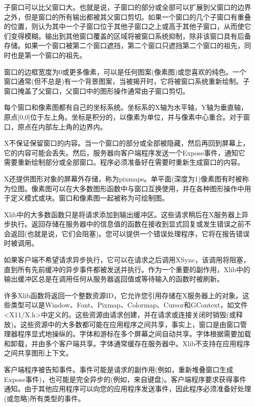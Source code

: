 子窗口可以比父窗口大。也就是说，子窗口的部分或全部可以扩展到父窗口的边界之外，但是窗口的所有输出都被其父窗口剪切。如果一个窗口的几个子窗口有重叠的位置，则认为其中一个子窗口位于其他子窗口之上或高于其他子窗口，从而使它们变得模糊。输出到其他窗口覆盖的区域将被窗口系统抑制，除非该窗口具有后备存储。如果一个窗口被第二个窗口遮挡，第二个窗口只遮挡第二个窗口的祖先，同时也是第一个窗口的祖先。

窗口的边框宽度为0或更多像素，可以是任何图案(像素图)或您喜欢的纯色。一个窗口通常(但不总是)有一个背景图案，当被揭开时，它将被窗口系统重新绘制。子窗口掩盖了父窗口，父窗口中的图形操作通常由子窗口剪切。

每个窗口和像素图都有自己的坐标系统。坐标系的X轴为水平轴，Y轴为垂直轴，原点[0,0]位于左上角。坐标是积分的，以像素为单位，并与像素中心重合。对于窗口，原点在内部左上角的边界内。

X不保证保留窗口的内容。当一个窗口的部分或全部被隐藏，然后再回到屏幕上，它的内容可能会丢失。然后，服务器向客户端程序发送一个Expose事件，通知它需要重新绘制部分或全部窗口。程序必须准备好在需要时重新生成窗口的内容。

X还提供图形对象的屏幕外存储，称为pixmaps。单平面(深度为1)像素图有时被称为位图。像素图可以在大多数图形函数中与窗口互换使用，并在各种图形操作中用于定义模式或块。窗口和像素图一起被称为可绘制图。

Xlib中的大多数函数只是将请求添加到输出缓冲区。这些请求稍后在X服务器上异步执行。返回存储在服务器中的信息值的函数在接收到显式回复或发生错误之前不会返回(也就是说，它们会阻塞)。您可以提供一个错误处理程序，它将在报告错误时被调用。

如果客户端不希望请求异步执行，它可以在请求之后调用XSync，该调用将阻塞，直到所有先前缓冲的异步事件都被发送并执行。作为一个重要的副作用，Xlib中的输出缓冲区总是在调用任何从服务器返回值或等待输入的函数时被刷新。

许多Xlib函数将返回一个整数资源ID，它允许您引用存储在X服务器上的对象。这些类型可以是Window、Font、Pixmap、Colormap、Cursor和GContext，如文件<X11/X.h>中定义的。这些资源由请求创建，并在请求或连接关闭时销毁(或释放)。这些资源中的大多数都可能在应用程序之间共享，事实上，窗口是由窗口管理器程序显式地操纵的。字体和游标在多个屏幕之间自动共享。字体根据需要加载和卸载，并由多个客户端共享。字体通常缓存在服务器中。Xlib不支持在应用程序之间共享图形上下文。

客户端程序被告知事件。事件可能是请求的副作用(例如，重新堆叠窗口生成Expose事件)，也可能是完全异步的(例如，来自键盘)。客户端程序要求获得事件通知。由于其他应用程序可以向您的应用程序发送事件，因此程序必须准备好处理(或忽略)所有类型的事件。

